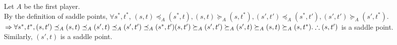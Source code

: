 \begin{pr}[2.12.19]
Let $A$ be the first player.\\
\newcommand{\leqa}{\preceq_A}
\newcommand{\geqa}{\succeq_A}
By the definition of saddle points, $\forall s^*, t^*$, $(s, t)\leqa(s^*, t), (s, t)\geqa(s, t^*), (s', t')\leqa(s^*, t'), (s', t')\geqa(s', t^*)$.\\
$\then\forall s^*, t^*,\\
(s, t')\leqa(s, t)\leqa(s', t)\leqa(s', t')\leqa(s^*, t')\\
(s, t')\geqa(s', t')\geqa(s', t)\geqa(s, t)\geqa(s, t^*).\\
\so(s, t')$ is a saddle point.\\
Similarly, $(s', t)$ is a saddle point.
\end{pr}
